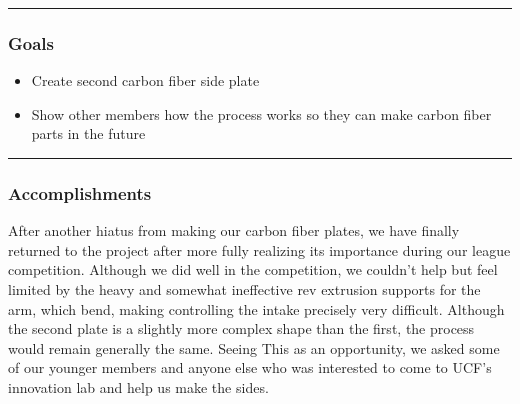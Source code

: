 \noindent\hfil\rule{\textwidth}{.4pt}\hfil
\subsubsection*{Goals}
\begin{itemize}
    \item Create second carbon fiber side plate
	\item Show other members how the process works so they can make carbon fiber parts in the future

\end{itemize} 

\noindent\hfil\rule{\textwidth}{.4pt}\hfil

\subsubsection*{Accomplishments}
After another hiatus from making our carbon fiber plates, we have finally returned to the project after more fully realizing its importance during our league competition. Although we did well in the competition, we couldn’t help but feel limited by the heavy and somewhat ineffective rev extrusion supports for the arm, which bend, making controlling the intake precisely very difficult. Although the second plate is a slightly more complex shape than the first, the process would remain generally the same. Seeing This as an opportunity, we asked some of our younger members and anyone else who was interested to come to UCF’s innovation lab and help us make the sides. 
